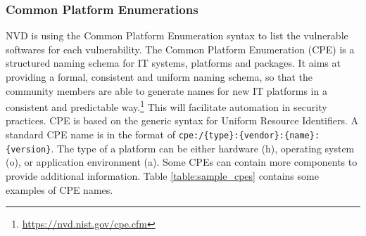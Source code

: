 \subsubsection{Common Platform Enumerations}
NVD is using the Common Platform Enumeration syntax to list the vulnerable softwares for each vulnerability. The Common Platform Enumeration (CPE) is a structured naming schema for IT systems, platforms and packages. It aims at providing a formal, consistent and uniform naming schema, so that the community members are able to generate names for new IT platforms in a consistent and predictable way.\footnote{\url{https://nvd.nist.gov/cpe.cfm}} This will facilitate automation in security practices. CPE is based on the generic syntax for Uniform Resource Identifiers. A standard CPE name is in the format of \texttt{cpe:/\{type\}:\{vendor\}:\{name\}:\{version\}}. The type of a platform can be either hardware (h), operating system (o), or application environment (a). Some CPEs can contain more components to provide additional information. Table \ref{table:sample_cpes} contains some examples of CPE names. 
\begin{table}
\begin{center}
    \caption{CPE Examples}
    \label{table:sample_cpes}
   \end{center}
    
\end{table}

